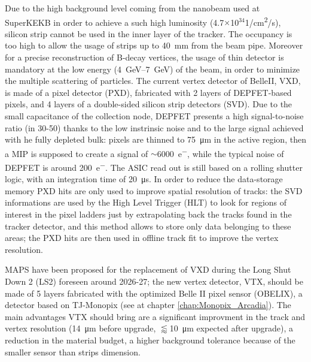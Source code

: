         Due to the high background level coming from the nanobeam used at SuperKEKB in order to achieve a such high luminosity (4.7$\times$10$^{34}$\si{1/cm\squared/s}), silicon strip cannot be used in the inner layer of the tracker. The occupancy is too high to allow the usage of strips up to \SI{40}{mm} from the beam pipe. 
        Moreover for a precise reconstruction of B-decay vertices, the usage of thin detector is mandatory at the low energy (\SIrange{4}{7}{GeV}) of the beam, in order to minimize the multiple scattering of particles. 
        The current vertex detector of BelleII, VXD, is made of a pixel detector (PXD), fabricated with 2 layers of DEPFET-based pixels, and 4 layers of a double-sided silicon strip detectors (SVD)\cite{BelleII-DEPFET}.
        Due to the small capacitance of the collection node, DEPFET presents a high signal-to-noise ratio (in 30-50) thanks to the low instrinsic noise and to the large signal achieved with he fully depleted bulk: pixels are thinned to \SI{75}{\um} in the active region, then a MIP is supposed to create a signal of $\sim$\SI{6000}{e^-}, while the typical noise of DEPFET is around \SI{200}{e^-}.
        The ASIC read out is still based on a rolling shutter logic, with an integration time of \SI{20}{\us}.
        In order to reduce the data-storage memory PXD hits are only used to improve spatial resolution of tracks: the SVD informations are used by the High Level Trigger (HLT) to look for regions of interest in the pixel ladders just by extrapolating back the tracks found in the tracker detector, and this method allows to store only data belonging to these areas; the PXD hits are then used in offline track fit to improve the vertex resolution.
        
        MAPS have been proposed for the replacement of VXD during the  Long Shut Down 2 (LS2) foreseen around 2026-27; the new vertex detector, VTX, should be made of 5 layers fabricated with the optimized Belle II pixel sensor (OBELIX), a detector based on TJ-Monopix (see at chapter \ref{chap:Monopix_Arcadia}).    
        The main advantages VTX should bring are a significant improvment in the track and vertex resolution (\SI{14}{\um} before upgrade, $\lessapprox$\SI{10}{\um} expected after upgrade), a reduction in the material budget, a higher background tolerance because of the smaller sensor than strips dimension.

